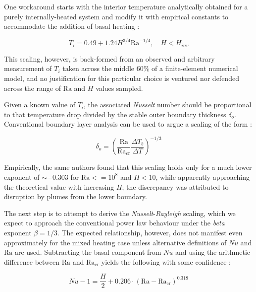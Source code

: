 One workaround starts with the interior temperature analytically obtained for a purely internally-heated system and modify it with empirical constants to accommodate the addition of basal heating \cite{Moore2008-je}:

\begin{equation}
T_i = 0.49 + 1.24 H^{3/4} {\mathrm{Ra}}^{-1/4}, \quad H < H_{inv}
\end{equation}

This scaling, however, is back-formed from an observed and arbitrary measurement of $T_i$ taken across the middle 60\% of a finite-element numerical model, and no justification for this particular choice is ventured nor defended across the range of $\mathrm{Ra}$ and $H$ values sampled.

Given a known value of $T_i$, the associated \textit{Nusselt} number should be proportional to that temperature drop divided by the stable outer boundary thickness ${\delta}_o$. Conventional boundary layer analysis can be used to argue a scaling of the form \cite{Schubert2001-ea}:

\begin{equation}
{\delta}_o = {\left( \frac{\mathrm{Ra}}{{\mathrm{Ra}}_{\mathrm{cr}}} \frac{\Delta T_b}{\Delta T} \right)}^{-1/3}
\end{equation}

Empirically, the same authors \cite{Moore2008-je} found that this scaling holds only for a much lower exponent of $\sim -0.303$ for $\mathrm{Ra}<=10^8$ and $H<10$, while apparently approaching the theoretical value with increasing $H$; the discrepancy was attributed to disruption by plumes from the lower boundary.

The next step is to attempt to derive the \textit{Nusselt}-\textit{Rayleigh} scaling, which we expect to approach the conventional power law behaviour under the \textit{beta} exponent $\beta = 1/3$. The expected relationship, however, does not manifest even approximately for the mixed heating case unless alternative definitions of $Nu$ and $\mathrm{Ra}$ are used. Subtracting the basal component from $Nu$ and using the arithmetic difference between $\mathrm{Ra}$ and ${\mathrm{Ra}}_{\mathrm{cr}}$ yields the following with some confidence \cite{Moore2008-je}:

\begin{equation}
Nu - 1 = \frac{H}{2} + 0.206 \cdot {\left( \mathrm{Ra} - {\mathrm{Ra}}_{\mathrm{cr}} \right)}^{0.318}
\end{equation}

